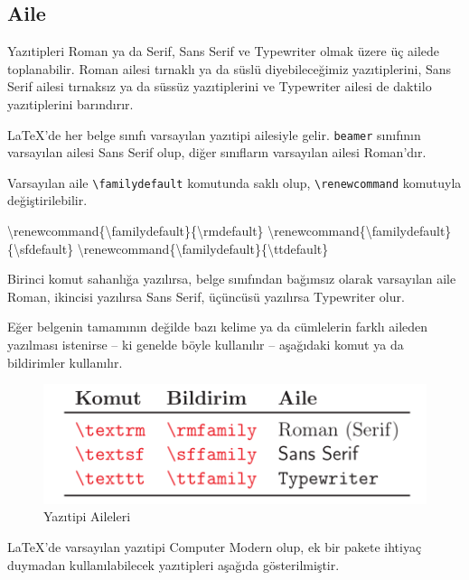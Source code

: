 \documentclass[
  10pt,
]{scrbook}
\newenvironment{Shaded}{\begin{snugshade}}{\end{snugshade}}
\newcommand{\NormalTok}[1]{#1}
\begin{document}
\hypertarget{aile}{%
\subsection{Aile}\label{aile}}

Yazıtipleri Roman ya da Serif, Sans Serif ve Typewriter olmak üzere üç
ailede toplanabilir. Roman ailesi tırnaklı ya da süslü diyebileceğimiz
yazıtiplerini, Sans Serif ailesi tırnaksız ya da süssüz yazıtiplerini ve
Typewriter ailesi de daktilo yazıtiplerini barındırır.

LaTeX'de her belge sınıfı varsayılan yazıtipi ailesiyle gelir. \texttt{beamer}
sınıfının varsayılan ailesi Sans Serif olup, diğer sınıfların varsayılan
ailesi Roman'dır.

Varsayılan aile \texttt{\textbackslash{}familydefault} komutunda saklı olup, \texttt{\textbackslash{}renewcommand}
komutuyla değiştirilebilir.

\begin{Shaded}
\begin{Highlighting}[numbers=left,,]
\NormalTok{\textbackslash{}renewcommand\{\textbackslash{}familydefault\}\{\textbackslash{}rmdefault\}  }
\NormalTok{\textbackslash{}renewcommand\{\textbackslash{}familydefault\}\{\textbackslash{}sfdefault\}  }
\NormalTok{\textbackslash{}renewcommand\{\textbackslash{}familydefault\}\{\textbackslash{}ttdefault\} }
\end{Highlighting}
\end{Shaded}

Birinci komut sahanlığa yazılırsa, belge sınıfından bağımsız olarak
varsayılan aile Roman, ikincisi yazılırsa Sans Serif, üçüncüsü yazılırsa
Typewriter olur.

Eğer belgenin tamamının değilde bazı kelime ya da cümlelerin farklı
aileden yazılması istenirse -- ki genelde böyle kullanılır -- aşağıdaki
komut ya da bildirimler kullanılır.

\begin{figure}
\centering
\includegraphics{images/yazitipi.png}
\caption{Yazıtipi
Aileleri}
\end{figure}

LaTeX'de varsayılan yazıtipi Computer Modern olup, ek bir pakete ihtiyaç
duymadan kullanılabilecek yazıtipleri aşağıda gösterilmiştir.
\end{document}
